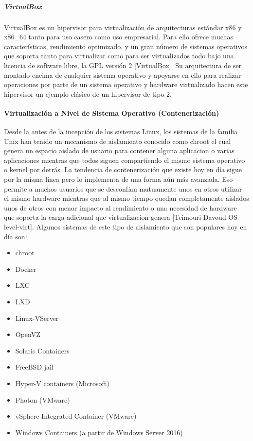 \subparagraph{VirtualBox}
VirtualBox es un hipervisor para virtualización de arquitecturas estándar x86 y x86\_64 tanto para uso casero como uso empresarial. Para ello ofrece muchas características, rendimiento optimizado, y un gran número de sistemas operativos que soporta tanto para virtualizar como para ser virtualizados todo bajo una licencia de software libre, la GPL versión 2 [VirtualBox]. Su arquitectura de ser montado encima de cualquier sistema operativo y apoyarse en ello para realizar operaciones por parte de un sistema operativo y hardware virtualizado hacen este hipervisor un ejemplo clásico de un hipervisor de tipo 2.

\paragraph{Virtualización a Nivel de Sistema Operativo (Contenerización)}
Desde la antes de la incepción de los sistemas Linux, los sistemas de la familia Unix han tenido un mecanismo de aislamiento conocido como chroot el cual genera un espacio aislado de usuario para contener alguna aplicacion o varias aplicaciones mientras que todos siguen compartiendo el mismo sistema operativo o kernel por detrás. La tendencia de contenerización que existe hoy en día sigue por la misma línea pero lo implementa de una forma aún más avanzada. Eso permite a muchos usuarios que se desconfían mutuamente unos en otros utilizar el mismo hardware mientras que al mismo tiempo quedan completamente aislados unos de otros con menor impacto al rendimiento o una necesidad de hardware que soporta la carga adicional que virtualizacion genera [Teimouri-Davoud-OS-level-virt]. Algunos sistemas de este tipo de aislamiento que son populares hoy en día son:
\begin{itemize}
	\item chroot
    \item Docker
    \item LXC
    \item LXD
    \item Linux-VServer
    \item OpenVZ
    \item Solaris Containers
    \item FreeBSD jail
    \item Hyper-V containers (Microsoft)
    \item Photon (VMware)
    \item vSphere Integrated Container (VMware)
    \item Windows Containers (a partir de Windows Server 2016)
\end{itemize}

